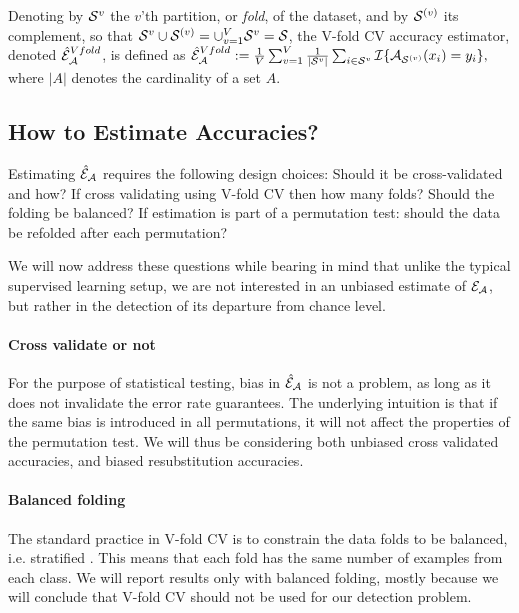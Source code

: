 \documentclass[]{bio}
\begin{document}
\begin{definition}
	\label{def:v-fold}
	Denoting by $\mathcal{S}^{v}$ the $v$'th partition, or \emph{fold}, of the dataset, and by $\mathcal{S}^{(v)}$ its complement, so that $\mathcal{S}^{v} \cup \mathcal{S}^{(v)}=\cup_{v=1}^V \mathcal{S}^{v}=\mathcal{S}$, the V-fold CV accuracy estimator, denoted $\hat{\mathcal{E}}_{\mathcal{A}}^{Vfold}$, is defined as 	
	$\hat{\mathcal{E}}_{\mathcal{A}}^{Vfold} := 
	\frac 1V \sum_{v=1}^{V} \frac{1}{|\mathcal{S}^v|} \sum_{i \in \mathcal{S}^{v}} \mathcal{I}{\{ \mathcal{A}_{\mathcal{S}^{(v)}}(x_i)=y_i \}},$
	where $|A|$ denotes the cardinality of a set $A$.
\end{definition}




\subsection{How to Estimate Accuracies?}
\label{sec:considerations}

Estimating $\hat{\mathcal{E}}_{\mathcal{A}}$ requires the following design choices: 
Should it be cross-validated and how? 
If cross validating using V-fold CV then how many folds? 
Should the folding be balanced?
If estimation is part of a permutation test: should the data be refolded after each permutation? 

We will now address these questions while bearing in mind that unlike the typical supervised learning setup, we are not interested in an unbiased estimate of $\mathcal{E}_{\mathcal{A}}$, but rather in the detection of its departure from chance level. 

\paragraph{Cross validate or not}
For the purpose of statistical testing, bias in $\hat{\mathcal{E}}_{\mathcal{A}}$ is not a problem, as long as it does not invalidate the error rate guarantees. 
The underlying intuition is that if the same bias is introduced in all permutations, it will not affect the properties of the permutation test. 
We will thus be considering both unbiased cross validated accuracies, and biased resubstitution accuracies.


\paragraph{Balanced folding}
The standard practice in V-fold CV is to constrain the data folds to be balanced, i.e. stratified \cite[for e.g.]{ojala_permutation_2010}.
This means that each fold has the same number of examples from each class. 
We will report results only with balanced folding, mostly because we will conclude that V-fold CV should not be used for our detection problem. 
\end{document}
